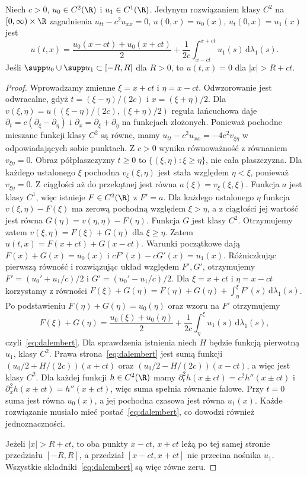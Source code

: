 \begin{twierdzenie}
\label{thm:dalembert}
Niech $c>0$, $u_0\in C^2(\R)$ i $u_1\in C^1(\R)$.
Jedynym rozwiązaniem klasy $C^2$ na $[0,\infty)\times\R$
zagadnienia
$u_{tt}-c^2u_{xx}=0$, $u(0,x)=u_0(x)$,
$u_t(0,x)=u_1(x)$ jest
\begin{equation}\label{eq:dalembert}
 u(t,x)=\frac{u_0(x-ct)+u_0(x+ct)}{2}
 +\frac{1}{2c}\int_{x-ct}^{x+ct}u_1(s)\,\mathrm d\lambda_1(s).
\end{equation}
Jeśli $\supp u_0\cup\supp u_1\subset[-R,R]$ dla $R>0$,
to $u(t,x)=0$ dla $|x|>R+ct$.
\end{twierdzenie}
\begin{proof}
Wprowadzamy zmienne $\xi=x+ct$ i $\eta=x-ct$.
Odwzorowanie jest odwracalne, gdyż
$t=(\xi-\eta)/(2c)$ i $x=(\xi+\eta)/2$.
Dla $v(\xi,\eta)=u((\xi-\eta)/(2c),(\xi+\eta)/2)$
reguła łańcuchowa daje $\partial_t=c(\partial_\xi-\partial_\eta)$
i $\partial_x=\partial_\xi+\partial_\eta$ na funkcjach
złożonych. Ponieważ pochodne mieszane funkcji klasy $C^2$
są równe, mamy
$u_{tt}-c^2u_{xx}=-4c^2v_{\xi\eta}$ w odpowiadających sobie
punktach. Z $c>0$ wynika równoważność z równaniem
$v_{\xi\eta}=0$. Obraz półpłaszczyzny $t\geq0$ to
$\{(\xi,\eta):\xi\geq\eta\}$, nie cała płaszczyzna.
Dla każdego ustalonego $\xi$ pochodna $v_\xi(\xi,\eta)$
jest stała względem $\eta<\xi$, ponieważ $v_{\xi\eta}=0$.
Z ciągłości aż do przekątnej jest równa $a(\xi)=v_\xi(\xi,\xi)$.
Funkcja $a$ jest klasy $C^1$, więc istnieje $F\in C^2(\R)$
z $F'=a$. Dla każdego ustalonego $\eta$ funkcja
$v(\xi,\eta)-F(\xi)$ ma zerową pochodną względem $\xi>\eta$,
a z ciągłości jej wartość jest równa
$G(\eta)=v(\eta,\eta)-F(\eta)$. Funkcja $G$ jest klasy $C^2$.
Otrzymujemy zatem $v(\xi,\eta)=F(\xi)+G(\eta)$ dla $\xi\geq\eta$.
Zatem $u(t,x)=F(x+ct)+G(x-ct)$.
Warunki początkowe dają
$F(x)+G(x)=u_0(x)$ i
$cF'(x)-cG'(x)=u_1(x)$.
Różniczkując pierwszą równość i rozwiązując układ względem
$F',G'$, otrzymujemy
$F'=(u_0'+u_1/c)/2$ i
$G'=(u_0'-u_1/c)/2$.
Dla $\xi=x+ct$ i $\eta=x-ct$ korzystamy z równości
$F(\xi)+G(\eta)=F(\eta)+G(\eta)+\int_\eta^\xi F'(s)\,\mathrm d\lambda_1(s)$.
Po podstawieniu $F(\eta)+G(\eta)=u_0(\eta)$ oraz wzoru na $F'$
otrzymujemy
\[
 F(\xi)+G(\eta)=\frac{u_0(\xi)+u_0(\eta)}2
 +\frac1{2c}\int_\eta^\xi u_1(s)\,\mathrm d\lambda_1(s),
\]
czyli~\eqref{eq:dalembert}.
Dla sprawdzenia istnienia niech $H$ będzie funkcją pierwotną
$u_1$, klasy $C^2$. Prawa strona~\eqref{eq:dalembert} jest sumą
funkcji $(u_0/2+H/(2c))(x+ct)$ oraz
$(u_0/2-H/(2c))(x-ct)$, a więc jest klasy $C^2$.
Dla każdej funkcji $h\in C^2(\R)$ mamy
$\partial_t^2h(x\pm ct)=c^2h''(x\pm ct)$ i
$\partial_x^2h(x\pm ct)=h''(x\pm ct)$, więc suma spełnia
równanie falowe. Przy $t=0$ suma jest równa $u_0(x)$,
a jej pochodna czasowa jest równa $u_1(x)$.
Każde rozwiązanie musiało mieć postać~\eqref{eq:dalembert},
co dowodzi również jednoznaczności.

Jeżeli $|x|>R+ct$, to oba punkty $x-ct$, $x+ct$ leżą
po tej samej stronie przedziału $[-R,R]$, a przedział
$[x-ct,x+ct]$ nie przecina nośnika $u_1$.
Wszystkie składniki~\eqref{eq:dalembert} są więc równe zeru.
\end{proof}


